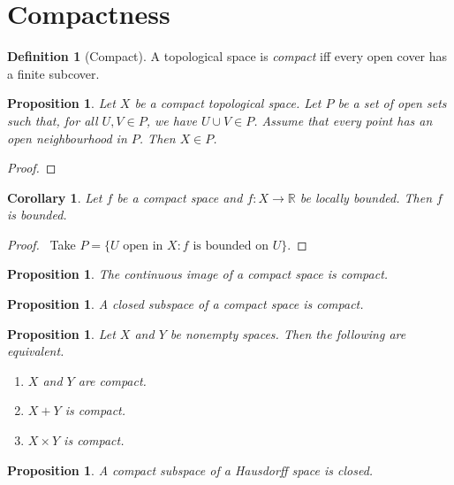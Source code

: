 \documentclass{book}
\let\qed\relax
\newtheorem{prop}[ax]{Proposition}
\newtheorem{cor}{Corollary}[ax]
\theoremstyle{definition}
\newtheorem{df}[ax]{Definition}
\begin{document}
\section{Compactness}

\begin{df}[Compact]
A topological space is \emph{compact} iff every open cover has a finite subcover.
\end{df}

\begin{prop}
Let $X$ be a compact topological space. Let $P$ be a set of open sets such that, for all $U,V \in P$, we have $U \cup V \in P$. Assume that every point has an open neighbourhood in $P$. Then $X \in P$.
\end{prop}

\begin{proof}
\pf
{}
\qed
\end{proof}

\begin{cor}
Let $f$ be a compact space and $f : X \rightarrow \mathbb{R}$ be locally bounded. Then $f$ is bounded.
\end{cor}

\begin{proof}
\pf\ Take $P = \{ U \text{ open in } X : f \text{ is bounded on } U \}$. \qed
\end{proof}

\begin{prop}
The continuous image of a compact space is compact.
\end{prop}

\begin{prop}
A closed subspace of a compact space is compact.
\end{prop}

\begin{prop}
Let $X$ and $Y$ be nonempty spaces. Then the following are equivalent.
\begin{enumerate}
\item $X$ and $Y$ are compact.
\item $X + Y$ is compact.
\item $X \times Y$ is compact.
\end{enumerate}
\end{prop}

\begin{prop}
A compact subspace of a Hausdorff space is closed.
\end{prop}
\end{document}
